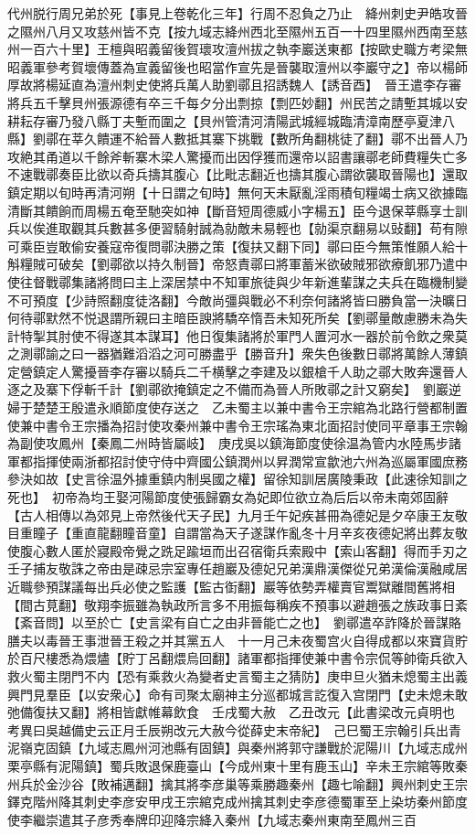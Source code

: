代州脱行周兄弟於死【事見上卷乾化三年】行周不忍負之乃止　絳州刺史尹皓攻晉之隰州八月又攻慈州皆不克【按九域志絳州西北至隰州五百一十四里隰州西南至慈州一百六十里】王檀與昭義留後賀瓌攻澶州拔之執李巖送東都【按歐史職方考梁無昭義軍參考賀壞傳蓋為宣義留後也昭當作宣先是晉襲取澶州以李巖守之】帝以楊師厚故將楊延直為澶州刺史使將兵萬人助劉鄩且招誘魏人【誘音酉】　晉王遣李存審將兵五千擊貝州張源德有卒三千每夕分出剽掠【剽匹妙翻】州民苦之請塹其城以安耕耘存審乃發八縣丁夫塹而圍之【貝州管清河清陽武城經城臨清漳南歷亭夏津八縣】劉鄩在莘久饋運不給晉人數抵其寨下挑戰【數所角翻桃徒了翻】鄩不出晉人乃攻絶其甬道以千餘斧斬寨木梁人驚擾而出因俘獲而還帝以詔書讓鄩老師費糧失亡多不速戰鄩奏臣比欲以奇兵擣其腹心【比毗志翻近也擣其腹心謂欲襲取晉陽也】還取鎮定期以旬時再清河朔【十日謂之旬時】無何天未厭亂淫雨積旬糧竭士病又欲據臨清斷其饋餉而周楊五奄至馳突如神【斷音短周德威小字楊五】臣今退保莘縣享士訓兵以俟進取觀其兵數甚多便習騎射誠為勍敵未易輕也【勍渠京翻易以䜴翻】苟有隙可乘臣豈敢偷安養寇帝復問鄩決勝之策【復扶又翻下同】鄩曰臣今無策惟願人給十斛糧賊可破矣【劉鄩欲以持久制晉】帝怒責鄩曰將軍蓄米欲破賊邪欲療飢邪乃遣中使往督戰鄩集諸將問曰主上深居禁中不知軍旅徒與少年新進輩謀之夫兵在臨機制變不可預度【少詩照翻度徒洛翻】今敵尚彊與戰必不利奈何諸將皆曰勝負當一決曠日何待鄩默然不悦退謂所親曰主暗臣諛將驕卒惰吾未知死所矣【劉鄩量敵慮勝未為失計特掣其肘使不得遂其本謀耳】他日復集諸將於軍門人置河水一器於前令飲之衆莫之測鄩諭之曰一器猶難滔滔之河可勝盡乎【勝音升】衆失色後數日鄩將萬餘人薄鎮定營鎮定人驚擾晉李存審以騎兵二千横擊之李建及以銀槍千人助之鄩大敗奔還晉人逐之及寨下俘斬千計【劉鄩欲掩鎮定之不備而為晉人所敗鄩之計又窮矣】　劉巖逆婦于楚楚王殷遣永順節度使存送之　乙未蜀主以兼中書令王宗綰為北路行營都制置使兼中書令王宗播為招討使攻秦州兼中書令王宗瑤為東北面招討使同平章事王宗翰為副使攻鳳州【秦鳳二州時皆屬岐】　庚戌吳以鎮海節度使徐温為管内水陸馬步諸軍都指揮使兩浙都招討使守侍中齊國公鎮潤州以昇潤常宣歙池六州為巡屬軍國庶務參決如故【史言徐温外據重鎮内制吳國之權】留徐知訓居廣陵秉政【此速徐知訓之死也】　初帝為均王娶河陽節度使張歸霸女為妃即位欲立為后后以帝未南郊固辭【古人相傳以為郊見上帝然後代天子民】九月壬午妃疾甚冊為德妃是夕卒康王友敬目重瞳子【重直龍翻瞳音童】自謂當為天子遂謀作亂冬十月辛亥夜德妃將出葬友敬使腹心數人匿於寢殿帝覺之跣足踰垣而出召宿衛兵索殿中【索山客翻】得而手刃之壬子捕友敬誅之帝由是疎忌宗室專任趙巖及德妃兄弟漢鼎漢傑從兄弟漢倫漢融咸居近職參預謀議每出兵必使之監護【監古衘翻】巖等依勢弄權賣官鬻獄離間舊將相【間古莧翻】敬翔李振雖為執政所言多不用振每稱疾不預事以避趙張之族政事日紊【紊音問】以至於亡【史言梁有自亡之由非晉能亡之也】　劉鄩遣卒詐降於晉謀賂膳夫以毒晉王事泄晉王殺之并其黨五人　十一月己未夜蜀宫火自得成都以來寶貨貯於百尺樓悉為煨燼【貯丁呂翻煨烏回翻】諸軍都指揮使兼中書令宗侃等帥衛兵欲入救火蜀主閉門不内【恐有乘救火為變者史言蜀主之猜防】庚申旦火猶未熄蜀主出義興門見羣臣【以安衆心】命有司聚太廟神主分巡都城言訖復入宫閉門【史未熄未敢弛備復扶又翻】將相皆獻帷幕飲食　壬戌蜀大赦　乙丑改元【此書梁改元貞明也　考異曰吳越備史云正月壬辰朔改元大赦今從薛史末帝紀】　己巳蜀王宗翰引兵出青泥嶺克固鎮【九域志鳳州河池縣有固鎮】與秦州將郭守謙戰於泥陽川【九域志成州栗亭縣有泥陽鎮】蜀兵敗退保鹿臺山【今成州東十里有鹿玉山】辛未王宗綰等敗秦州兵於金沙谷【敗補邁翻】擒其將李彦巢等乘勝趣秦州【趣七喻翻】興州刺史王宗鐸克階州降其刺史李彦安甲戌王宗綰克成州擒其刺史李彦德蜀軍至上染坊秦州節度使李繼崇遣其子彦秀奉牌印迎降宗絳入秦州【九域志秦州東南至鳳州三百